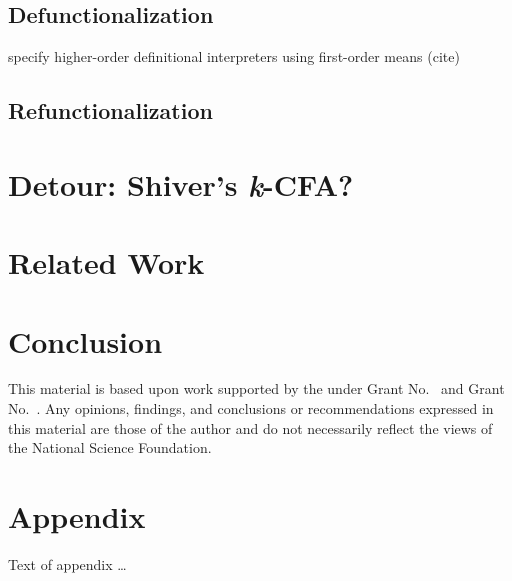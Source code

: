 \documentclass[acmsmall,review,anonymous]{acmart}\settopmatter{printfolios=true,printccs=false,printacmref=false}
\begin{document}
\subsection{Defunctionalization}

specify higher-order definitional interpreters using first-order means (cite)

\subsection{Refunctionalization}

\section{Detour: Shiver's \textit{k}-CFA?}

\section{Related Work}

\section{Conclusion}

\begin{acks}                            %
  This material is based upon work supported by the
   under Grant
  No.~ and Grant
  No.~.  Any opinions, findings, and
  conclusions or recommendations expressed in this material are those
  of the author and do not necessarily reflect the views of the
  National Science Foundation.
\end{acks}



\appendix
\section{Appendix}

Text of appendix \ldots
\end{document}
